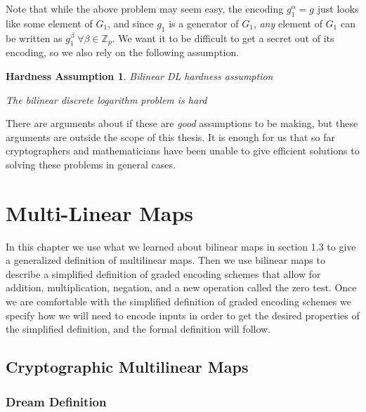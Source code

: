 \documentclass[12pt,twoside]{reedthesis}
\newtheorem{assumption}{Hardness Assumption}
\newcommand{\Z}[0]{\mathbb{Z}}
\begin{document}
    Note that while the above problem may seem easy, the encoding $g_1^\alpha = g $ just looks like some element of $G_1$, and since $g_1$ is a generator of $G_1$, \textit{any} element of $G_1$ can be written as $g_1^\beta \; \forall \beta \in \Z_p$. We want it to be difficult to get a secret out of its encoding, so we also rely on the following assumption.
    
    \begin{assumption}{Bilinear DL hardness assumption}
    \par The bilinear discrete logarithm problem is hard
    \end{assumption}
   
    
   \par There are arguments about if these are \textit{good} assumptions to be making, but these arguments are outside the scope of this thesis. It is enough for us that so far cryptographers and mathematicians have been unable to give efficient solutions to solving these problems in general cases.
    
    
    \chapter{Multi-Linear Maps}
    

    In this chapter we use what we learned about bilinear maps in section 1.3 to give a generalized definition of multilinear maps. Then we use bilinear maps to describe a simplified definition of graded encoding schemes that allow for addition, multiplication, negation, and a new operation called the zero test. Once we are comfortable with the simplified definition of graded encoding schemes we specify how we will need to encode inputs in order to get the desired properties of the simplified definition, and the formal definition will follow. 
    \section{Cryptographic Multilinear Maps}
    
    
    \subsection{Dream Definition}
    
\end{document}
